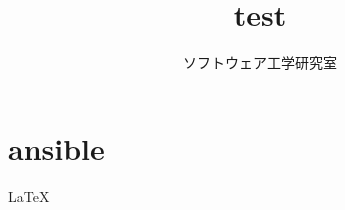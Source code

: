 \documentclass[twocolumn]{jarticle}
\begin{document}
\title{test}
\author{ソフトウェア工学研究室}
\maketitle

\section{ansible}
\LaTeX
\end{document}
